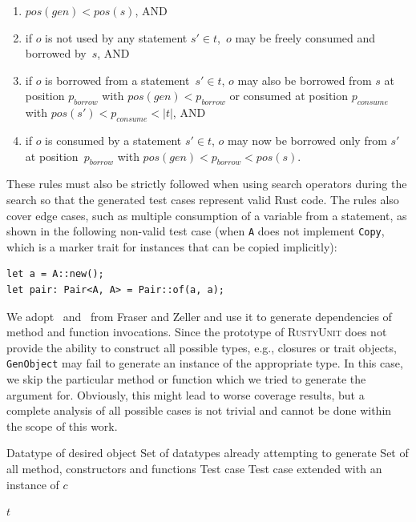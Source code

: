 \documentclass[paper=a4,%
  twoside,%
  BCOR4mm,%
  abstract=true,%
  toc=bibliography,%
  chapterprefix=true,%
  toc=bibliographynumbered,%
  open=right,%
  english,%
  pagesize=pdftex]{scrreprt}
\newcommand{\Desc}[2]{\State \makebox[2em][l]{#1}#2}
\newcommand{\tech}{\textsc{RustyUnit}\xspace}
\begin{document}
\begin{enumerate}
    \item $pos(gen) < pos(s)$, AND
    \item if $o$ is not used by any statement $s' \in t$,~$o$ may be freely consumed and borrowed by~$s$, AND
    \item if $o$ is borrowed from a statement~$s' \in t$, $o$ may also be borrowed from $s$ at position $p_{borrow}$ with $pos(gen) < p_{borrow}$ or consumed at position $p_{consume}$ with $pos(s') < p_{consume} < \left|t\right|$, AND
    \item if $o$ is consumed by a statement $s' \in t$, $o$ may now be borrowed only from $s'$ at position~$p_{borrow}$ with $pos(gen) < p_{borrow} < pos(s)$.
\end{enumerate}

These rules must also be strictly followed when using search operators during the search so that the generated test cases represent valid Rust code. The rules also cover edge cases, such as multiple consumption of a variable from a statement, as shown in the following non-valid test case (when \texttt{A} does not implement \texttt{Copy}, which is a marker trait for instances that can be copied implicitly):
\begin{lstlisting}[style=boxed, caption={}]
let a = A::new();
let pair: Pair<A, A> = Pair::of(a, a);
\end{lstlisting}

We adopt~ and~ from Fraser and Zeller and use it to generate dependencies of method and function invocations. Since the prototype of \tech does not provide the ability to construct all possible types, e.g., closures or trait objects, \texttt{GenObject} may fail to generate an instance of the appropriate type. In this case, we skip the particular method or function which we tried to generate the argument for. Obviously, this might lead to worse coverage results, but a complete analysis of all possible cases is not trivial and cannot be done within the scope of this work.

\begin{algorithm}[t]
\caption{$GenObject(c, G, M, t)$}
\label{alg:genobject}
\begin{algorithmic}
\Input
  \Desc{$c$}{Datatype of desired object}
  \Desc{$G$}{Set of datatypes already attempting to generate}
  \Desc{$M$}{Set of all method, constructors and functions}
  \Desc{$t$}{Test case}
\EndInput
\Output
  \Desc{$t$}{Test case extended with an instance of $c$}
\EndOutput
{}

  \EndIf
\EndFor
{}
\State \Return $t$
\end{algorithmic}
\end{algorithm}
\end{document}
